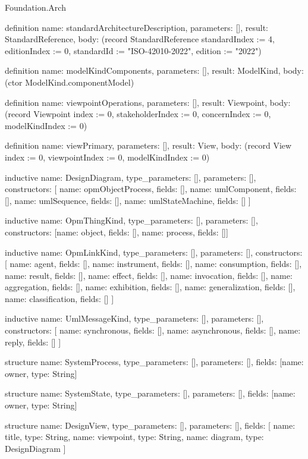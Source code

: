 \begin{lexlean}{Foundation.Arch}
\begin{semanticmodule}
definition{
  name: standardArchitectureDescription,
  parameters: [],
  result: StandardReference,
  body: (record StandardReference {standardIndex := 4, editionIndex := 0, standardId := "ISO-42010-2022", edition := "2022"})
}

definition{
  name: modelKindComponents,
  parameters: [],
  result: ModelKind,
  body: (ctor ModelKind.componentModel)
}

definition{
  name: viewpointOperations,
  parameters: [],
  result: Viewpoint,
  body: (record Viewpoint {index := 0, stakeholderIndex := 0, concernIndex := 0, modelKindIndex := 0})
}

definition{
  name: viewPrimary,
  parameters: [],
  result: View,
  body: (record View {index := 0, viewpointIndex := 0, modelKindIndex := 0})
}

inductive{
  name: DesignDiagram,
  type_parameters: [],
  parameters: [],
  constructors: [
    {name: opmObjectProcess, fields: []},
    {name: umlComponent, fields: []},
    {name: umlSequence, fields: []},
    {name: umlStateMachine, fields: []}
  ]
}

inductive{
  name: OpmThingKind,
  type_parameters: [],
  parameters: [],
  constructors: [{name: object, fields: []}, {name: process, fields: []}]
}

inductive{
  name: OpmLinkKind,
  type_parameters: [],
  parameters: [],
  constructors: [
    {name: agent, fields: []},
    {name: instrument, fields: []},
    {name: consumption, fields: []},
    {name: result, fields: []},
    {name: effect, fields: []},
    {name: invocation, fields: []},
    {name: aggregation, fields: []},
    {name: exhibition, fields: []},
    {name: generalization, fields: []},
    {name: classification, fields: []}
  ]
}

inductive{
  name: UmlMessageKind,
  type_parameters: [],
  parameters: [],
  constructors: [
    {name: synchronous, fields: []},
    {name: asynchronous, fields: []},
    {name: reply, fields: []}
  ]
}

structure{
  name: SystemProcess,
  type_parameters: [],
  parameters: [],
  fields: [{name: owner, type: String}]
}

structure{
  name: SystemState,
  type_parameters: [],
  parameters: [],
  fields: [{name: owner, type: String}]
}

structure{
  name: DesignView,
  type_parameters: [],
  parameters: [],
  fields: [
    {name: title, type: String},
    {name: viewpoint, type: String},
    {name: diagram, type: DesignDiagram}
  ]
}


\end{semanticmodule}
\end{lexlean}
